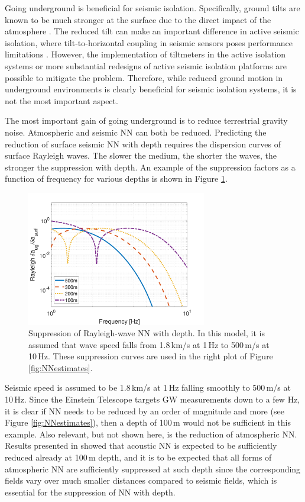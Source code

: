 Going underground is beneficial for seismic isolation. Specifically, ground tilts are known to be much stronger at the surface due to the direct impact of the atmosphere \cite{DABo2012}. The reduced tilt can make an important difference in active seismic isolation, where tilt-to-horizontal coupling in seismic sensors poses performance limitations \cite{MaEv2015,MLMa2018}. However, the implementation of tiltmeters in the active isolation systems \cite{VeEA2014} or more substantial redesigns of active seismic isolation platforms \cite{MLMa2018} are possible to mitigate the problem. Therefore, while reduced ground motion in underground environments is clearly beneficial for seismic isolation systems, it is not the most important aspect. 

The most important gain of going underground is to reduce terrestrial gravity noise. Atmospheric and seismic NN can both be reduced. Predicting the reduction of surface seismic NN with depth requires the dispersion curves of surface Rayleigh waves. The slower the medium, the shorter the waves, the stronger the suppression with depth. An example of the suppression factors as a function of frequency for various depths is shown in Figure \ref{fig:RayleighNNdepth}. 
\begin{figure}[t]
	\begin{center} 
		\includegraphics[width=0.7\textwidth]{./SiteInfra/SiteRequirements/SiteRequirementsFigures/RayleighNNdepth.pdf} 
		\caption{Suppression of Rayleigh-wave NN with depth. In this model, it is assumed that wave speed falls from 1.8\,km/s at 1\,Hz to 500\,m/s at 10\,Hz. These suppression curves are used in the right plot of Figure \ref{fig:NNestimates}.}
		\label{fig:RayleighNNdepth} 
	\end{center}
\end{figure}
Seismic speed is assumed to be 1.8\,km/s at 1\,Hz falling smoothly to 500\,m/s at 10\,Hz. Since the Einstein Telescope targets GW measurements down to a few Hz, it is clear if NN needs to be reduced by an order of magnitude and more (see Figure \ref{fig:NNestimates}), then a depth of 100\,m would not be sufficient in this example. Also relevant, but not shown here, is the reduction of atmospheric NN. Results presented in \cite{FiEA2018} showed that acoustic NN is expected to be sufficiently reduced already at 100\,m depth, and it is to be expected that all forms of atmospheric NN are sufficiently suppressed at such depth since the corresponding fields vary over much smaller distances compared to seismic fields, which is essential for the suppression of NN with depth. 


